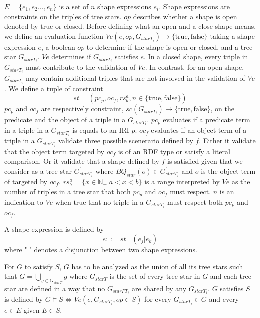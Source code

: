 $E = \{e_1, e_2 ..., e_{n}\}$ is a set of $n$ shape expressions $e_i$.
Shape expressions are constraints on the triples of tree stars.
$op$ describes whether a shape is open denoted by $\mathrm{true}$ or closed.
Before defining what an open and a close shape means, we define an evaluation function 
$Ve(e, op, G_{starT_i}) \rightarrow \{\mathrm{true}, \mathrm{false} \}$
taking a shape expression $e$, a boolean $op$ to determine if the shape is open or closed, and a tree star $G_{starT_i}$.
$Ve$ determines if $G_{starT_i}$ satisfies $e$.
In a closed shape, every triple in $G_{starT_i}$ must contribute to the validation of $Ve$.
In contrast, for an open shape, $G_{starT_i}$ may contain additional triples that are not involved in the validation of $Ve$.
We define a tuple of constraint
\begin{equation}
    st = (pc_p, oc_f, rs^a_b, n \in \{\mathrm{true}, \mathrm{false}\})
\end{equation}
$pc_p$ and $oc_f$ are respectively constraint,
$sc(G_{starT_i})  \rightarrow \{\mathrm{true}, \mathrm{false}\}$,
on the predicate and the object of a triple in a $G_{starT_i}$.
$pc_p$ evaluates if a predicate term in a triple in a $G_{starT_i}$ is equals to an IRI $p$.
$oc_f$ evaluates if an object term of a triple in a $G_{starT_i}$ validate three possible scenerario defined by $f$.
Either it validate that the object term targeted by $oc_f$ is of an RDF type or satisfy a literal comparison.
Or it validate that a shape defined by $f$ is satisfied given that we consider as a tree star 
$G_{starT_i}^{\prime}$ where $BQ_{star}(o) \in G_{starT_i}^{\prime}$ and $o$ is the object term of targeted by $oc_f$.
$rs^a_b = \{x \in \mathbb{N}_+ | a < x < b \}$ is a range interpreted by $Ve$ as the number of triples in a tree star that both $pc_p$ and $oc_f$ must respect.
$n$ is an indication to $Ve$ when $\mathrm{true}$ that no triple in a $G_{starT_i}$ must respect both $pc_p$ and $oc_f$. 

A shape expression is defined by
\begin{equation}
 e ::= st \mid (e_j|e_k)
\end{equation}
where "$|$" denotes a disjunction between two shape expressions.

For $G$ to satisfy $S$, $G$ has to be analyzed as the union of all its tree stars such that $G = \bigcup_{g \in G_{starT}} g$ where $G_{starT}$ is the set of every tree star in $G$
and each tree star are defined in a way that no $G_{starPT_i}$ are shared by any $G_{starT_i}$.
$G$ satisfies $S$ is defined by $G \models S \iff Ve(e,G_{starT_i}, op\in S)$  for every $G_{starT_i} \in G$ and every $e \in E$ given $E \in S$.

